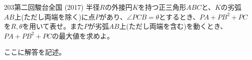 \begin{prob}{203}{}{第二回駿台全国 (2017)}
 半径$R$の外接円$K$を持つ正三角形$ABC$と、$K$の劣弧$AB$上(ただし両端を除く)に点$P$があり、$\angle{PCB}=\theta$とするとき、$PA+PB^2+PC$を$R, \theta$を用いて表せ。また$P$が劣弧$AB$上(ただし両端を含む)を動くとき、$PA+PB^2+PC$の最大値を求めよ。
\end{prob}
ここに解答を記述。